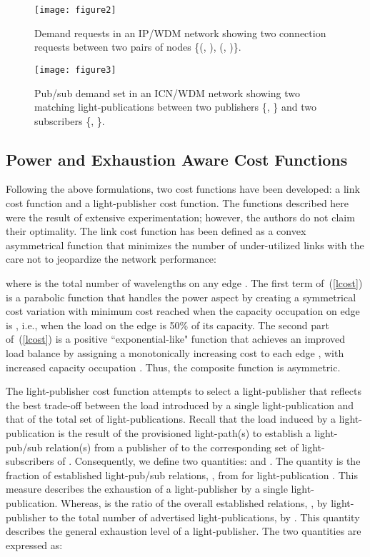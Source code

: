 \documentclass[journal]{IEEEtran}
\begin{document}
 \begin{figure}[tb]
  \centering
\texttt{[image: figure2]}
  \caption{Demand requests in an IP/WDM network showing two connection requests between two pairs of nodes \{(, ), (, )\}.}
  \label{fig:ipdm}
 \end{figure}
 \begin{figure}[tb]
  \centering
  \texttt{[image: figure3]}
  \caption{Pub/sub demand set in an ICN/WDM network showing two matching light-publications between two publishers \{, \} and two subscribers \{, \}.}
  \label{fig:icndm}
 \end{figure}
\subsection{Power and Exhaustion Aware Cost Functions}\label{costfun}
Following the above formulations, two cost functions have been
developed: a link cost function and a light-publisher cost
function.
The functions described here were the result of extensive
experimentation; however, the authors do not claim their optimality.
The link cost function  has been defined as a convex asymmetrical function that minimizes the number of under-utilized links with the care not to jeopardize the network performance:

where  is the total number of wavelengths on any edge . The first term of~(\ref{lcost}) is a parabolic function that handles the power aspect by creating a symmetrical cost variation with minimum cost reached when the capacity occupation on edge  is , i.e., when the load on the edge is 50\% of its capacity. The second part of~(\ref{lcost}) is a positive ``exponential-like" function that achieves an improved load balance by assigning a monotonically increasing cost to each edge , with increased capacity occupation . Thus, the composite function is asymmetric. 

The light-publisher cost function attempts to select a light-publisher that reflects the best trade-off between the load introduced by a single light-publication and that of the total set of light-publications. Recall that the load induced by a light-publication  is the result of the provisioned light-path(s) to establish a light-pub/sub relation(s) from a publisher of  to the corresponding set of light-subscribers of .
Consequently, we define two quantities:  and . The quantity  is the fraction of established light-pub/sub relations, , from  for light-publication . This measure describes the exhaustion of a light-publisher by a single light-publication. Whereas,  is the ratio of the overall established relations, , by light-publisher  to the total number of advertised light-publications, by . This quantity describes the general exhaustion level of a light-publisher. The two quantities are expressed as:
\end{document}
